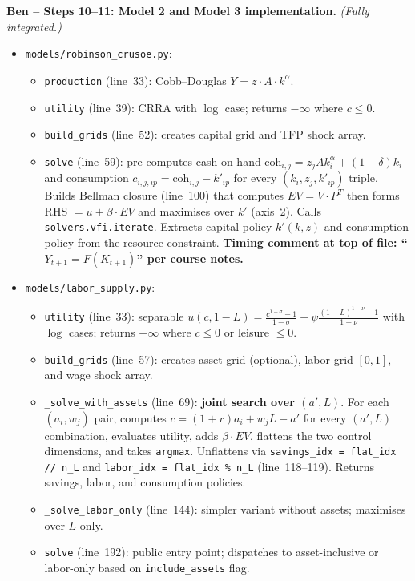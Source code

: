 \documentclass[11pt]{article}
\begin{document}
\begin{intuitbox}
\medskip
\textbf{Ben -- Steps 10--11: Model 2 and Model 3 implementation.} \textit{(Fully integrated.)}
\begin{itemize}
    \item \texttt{models/robinson\_crusoe.py}:
    \begin{itemize}
        \item \texttt{production} (line~33): Cobb--Douglas $Y = z \cdot A \cdot k^\alpha$.
        \item \texttt{utility} (line~39): CRRA with $\log$ case; returns $-\infty$ where $c\leq 0$.
        \item \texttt{build\_grids} (line~52): creates capital grid and TFP shock array.
        \item \texttt{solve} (line~59): pre-computes cash-on-hand $\text{coh}_{i,j} = z_j A k_i^\alpha + (1-\delta)k_i$ and consumption $c_{i,j,ip} = \text{coh}_{i,j} - k'_{ip}$ for every $(k_i, z_j, k'_{ip})$ triple. Builds Bellman closure (line~100) that computes $EV = V \cdot P^T$ then forms RHS $= u + \beta \cdot EV$ and maximises over $k'$ (axis~2). Calls \texttt{solvers.vfi.iterate}. Extracts capital policy $k'(k,z)$ and consumption policy from the resource constraint. \textbf{Timing comment at top of file: ``$Y_{t+1}=F(K_{t+1})$'' per course notes.}
    \end{itemize}
    \item \texttt{models/labor\_supply.py}:
    \begin{itemize}
        \item \texttt{utility} (line~33): separable $u(c,1-L) = \frac{c^{1-\sigma}-1}{1-\sigma} + \psi\frac{(1-L)^{1-\nu}-1}{1-\nu}$ with $\log$ cases; returns $-\infty$ where $c\leq 0$ or leisure $\leq 0$.
        \item \texttt{build\_grids} (line~57): creates asset grid (optional), labor grid $[0,1]$, and wage shock array.
        \item \texttt{\_solve\_with\_assets} (line~69): \textbf{joint search over $(a', L)$}. For each $(a_i, w_j)$ pair, computes $c = (1+r)a_i + w_j L - a'$ for every $(a', L)$ combination, evaluates utility, adds $\beta \cdot EV$, flattens the two control dimensions, and takes \texttt{argmax}. Unflattens via \texttt{savings\_idx = flat\_idx // n\_L} and \texttt{labor\_idx = flat\_idx \% n\_L} (line~118--119). Returns savings, labor, and consumption policies.
        \item \texttt{\_solve\_labor\_only} (line~144): simpler variant without assets; maximises over $L$ only.
        \item \texttt{solve} (line~192): public entry point; dispatches to asset-inclusive or labor-only based on \texttt{include\_assets} flag.

\end{itemize}
\end{itemize}
\end{intuitbox}
\end{document}
